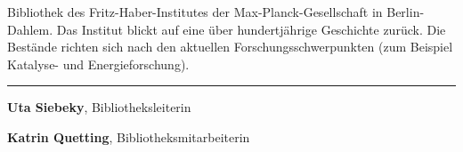 Bibliothek des Fritz-Haber-Institutes der Max-Planck-Gesellschaft in
Berlin-Dahlem. Das Institut blickt auf eine über hundertjährige
Geschichte zurück. Die Bestände richten sich nach den aktuellen
Forschungsschwerpunkten (zum Beispiel Katalyse- und Energieforschung).

\begin{center}\rule{0.5\linewidth}{\linethickness}\end{center}

\textbf{Uta Siebeky}, Bibliotheksleiterin

\textbf{Katrin Quetting}, Bibliotheksmitarbeiterin
